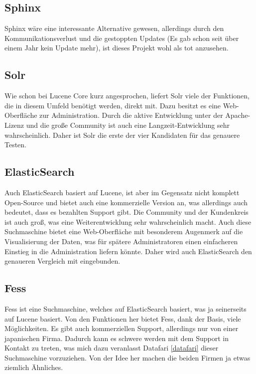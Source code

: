\subsection{Sphinx}

Sphinx wäre eine interessante Alternative gewesen, allerdings durch den Kommunikationsverlust und die gestoppten Updates (Es gab schon seit über einem Jahr kein Update mehr), ist dieses Projekt wohl als tot anzusehen. \cite{SphinxTechnologiesInc.2019}

\subsection{Solr}

Wie schon bei Lucene Core kurz angesprochen, liefert Solr viele der Funktionen, die in diesem Umfeld benötigt werden, direkt mit. Dazu besitzt es eine Web-Oberfläche zur Administration. Durch die aktive Entwicklung unter der Apache-Lizenz und die große Community ist auch eine Langzeit-Entwicklung sehr wahrscheinlich. Daher ist Solr die erste der vier Kandidaten für das genauere Testen. \cite{TheApacheSoftwareFoundation.2019}

\subsection{ElasticSearch}

Auch ElasticSearch basiert auf Lucene, ist aber im Gegensatz nicht komplett Open-Source und bietet auch eine kommerzielle Version an, was allerdings auch bedeutet, dass es bezahlten Support gibt. Die Community und der Kundenkreis ist auch groß, was eine Weiterentwicklung sehr wahrscheinlich macht. Auch diese Suchmaschine bietet eine Web-Oberfläche mit besonderem Augenmerk auf die Visualisierung der Daten, was für spätere Administratoren einen einfacheren Einstieg in die Administration liefern könnte. Daher wird auch ElasticSearch den genaueren Vergleich mit eingebunden. \cite{Elasticsearch.2019}

\subsection{Fess}

Fess ist eine Suchmaschine, welches auf ElasticSearch basiert, was ja seinerseits auf Lucene basiert. Von den Funktionen her bietet Fess, dank der Basis, viele Möglichkeiten. Es gibt auch kommerziellen Support, allerdings nur von einer japanischen Firma. Dadurch kann es schwere werden mit dem Support in Kontakt zu treten, was mich dazu veranlasst Datafari \ref{datafari} dieser Suchmaschine vorzuziehen. Von der Idee her machen die beiden Firmen ja etwas ziemlich Ähnliches. \cite{CodeLibs.2019}


